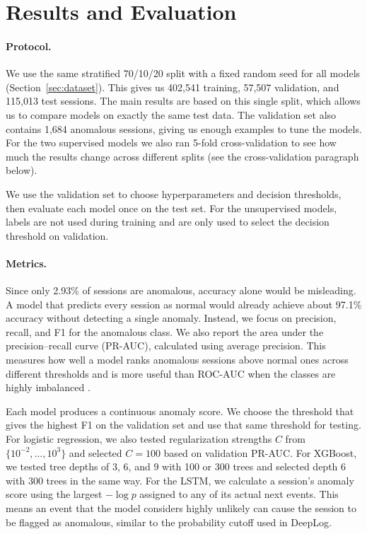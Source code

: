\documentclass[11pt]{article}
\begin{document}
\section{Results and Evaluation}
\label{sec:results}

\paragraph{Protocol.} We use the same stratified 70/10/20 split with a fixed random seed for all models (Section~\ref{sec:dataset}). This gives us 402,541 training, 57,507 validation, and 115,013 test sessions. The main results are based on this single split, which allows us to compare models on exactly the same test data. The validation set also contains 1,684 anomalous sessions, giving us enough examples to tune the models. For the two supervised models we also ran 5-fold cross-validation to see how much the results change across different splits (see the cross-validation paragraph below).

We use the validation set to choose hyperparameters and decision thresholds, then evaluate each model once on the test set. For the unsupervised models, labels are not used during training and are only used to select the decision threshold on validation.

\paragraph{Metrics.} Since only 2.93\% of sessions are anomalous, accuracy alone would be misleading. A model that predicts every session as normal would already achieve about 97.1\% accuracy without detecting a single anomaly. Instead, we focus on precision, recall, and F1 for the anomalous class. We also report the area under the precision--recall curve (PR-AUC), calculated using average precision. This measures how well a model ranks anomalous sessions above normal ones across different thresholds and is more useful than ROC-AUC when the classes are highly imbalanced \citep{Saito2015}.

Each model produces a continuous anomaly score. We choose the threshold that gives the highest F1 on the validation set and use that same threshold for testing. For logistic regression, we also tested regularization strengths $C$ from $\{10^{-2},\dots,10^{3}\}$ and selected $C=100$ based on validation PR-AUC. For XGBoost, we tested tree depths of 3, 6, and 9 with 100 or 300 trees and selected depth 6 with 300 trees in the same way. For the LSTM, we calculate a session's anomaly score using the largest $-\log p$ assigned to any of its actual next events. This means an event that the model considers highly unlikely can cause the session to be flagged as anomalous, similar to the probability cutoff used in DeepLog.
\end{document}
